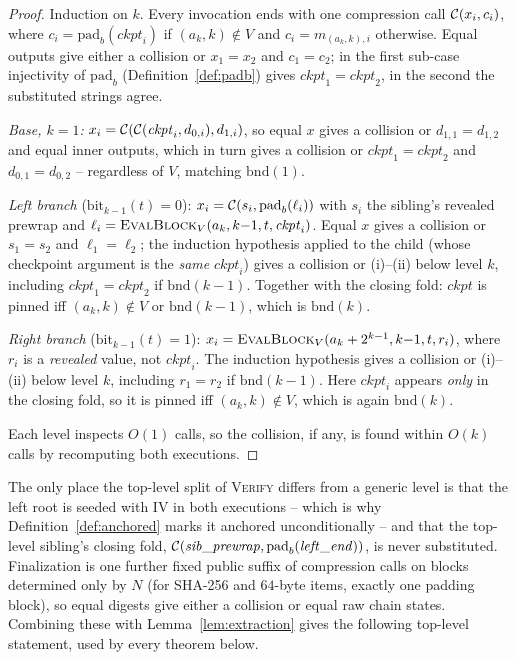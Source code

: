 \begin{proof}
Induction on $k$. Every invocation ends with one compression call
$\mathcal{C}(x_i, c_i)$, where $c_i = \mathrm{pad}_b(\mathit{ckpt}_i)$ if
$(a_k,k) \notin V$ and $c_i = m_{(a_k,k),i}$ otherwise. Equal outputs give
either a collision or $x_1 = x_2$ and $c_1 = c_2$; in the first sub-case
injectivity of $\mathrm{pad}_b$ (Definition~\ref{def:padb}) gives
$\mathit{ckpt}_1 = \mathit{ckpt}_2$, in the second the substituted strings
agree.

\emph{Base, $k=1$:} $x_i = \mathcal{C}(\mathcal{C}(\mathit{ckpt}_i, d_{0,i}), d_{1,i})$, so
equal $x$ gives a collision or $d_{1,1} = d_{1,2}$ and equal inner outputs,
which in turn gives a collision or $\mathit{ckpt}_1 = \mathit{ckpt}_2$ and
$d_{0,1} = d_{0,2}$ -- regardless of $V$, matching $\mathrm{bnd}(1)$.

\emph{Left branch} ($\mathrm{bit}_{k-1}(t) = 0$): $x_i =
\mathcal{C}(s_i, \mathrm{pad}_b(\ell_i))$ with $s_i$ the sibling's revealed prewrap
and $\ell_i = \textsc{EvalBlock}_V(a_k, k{-}1, t, \mathit{ckpt}_i)$. Equal
$x$ gives a collision or $s_1 = s_2$ and $\ell_1 = \ell_2$; the induction
hypothesis applied to the child (whose checkpoint argument is the
\emph{same} $\mathit{ckpt}_i$) gives a collision or (i)--(ii) below level
$k$, including $\mathit{ckpt}_1 = \mathit{ckpt}_2$ if $\mathrm{bnd}(k-1)$.
Together with the closing fold: $\mathit{ckpt}$ is pinned iff $(a_k,k)
\notin V$ or $\mathrm{bnd}(k-1)$, which is $\mathrm{bnd}(k)$.

\emph{Right branch} ($\mathrm{bit}_{k-1}(t) = 1$): $x_i =
\textsc{EvalBlock}_V(a_k + 2^{k-1}, k{-}1, t, r_i)$, where $r_i$ is a
\emph{revealed} value, not $\mathit{ckpt}_i$. The induction hypothesis
gives a collision or (i)--(ii) below level $k$, including $r_1 = r_2$ if
$\mathrm{bnd}(k-1)$. Here $\mathit{ckpt}_i$ appears \emph{only} in the
closing fold, so it is pinned iff $(a_k,k) \notin V$, which is again
$\mathrm{bnd}(k)$.

Each level inspects $O(1)$ calls, so the collision, if any, is found within
$O(k)$ calls by recomputing both executions.
\end{proof}

The only place the top-level split of \textsc{Verify} differs from a
generic level is that the left root is seeded with $\mathrm{IV}$ in both
executions -- which is why Definition~\ref{def:anchored} marks it anchored
unconditionally -- and that the top-level sibling's closing fold,
$\mathcal{C}(\mathit{sib\_prewrap}, \mathrm{pad}_b(\mathit{left\_end}))$, is never
substituted. Finalization is one further fixed public suffix of compression
calls on blocks determined only by $N$ (for SHA-256 and $64$-byte items,
exactly one padding block), so equal digests give either a collision or
equal raw chain states. Combining these with Lemma~\ref{lem:extraction}
gives the following top-level statement, used by every theorem below.

